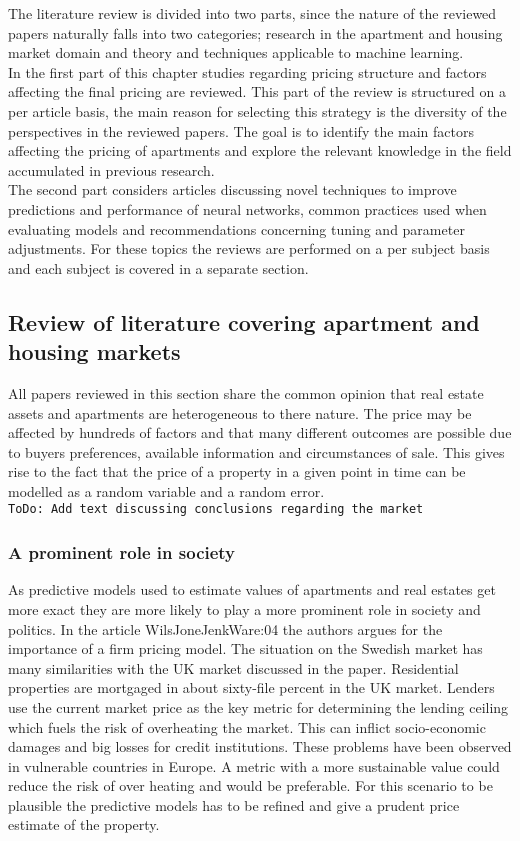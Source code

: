 The literature review is divided into two parts, since the nature of the reviewed papers naturally falls into two categories; research in the apartment and housing market domain and theory and techniques applicable to machine learning. 
\\
In the first part of this chapter studies regarding pricing structure and factors affecting the final pricing are reviewed. This part of the review is structured on a per article basis, the main reason for selecting this strategy is the diversity of the perspectives in the reviewed papers. The goal is to identify the main factors affecting the pricing of apartments and explore the relevant knowledge in the field accumulated in previous research. 
\\
The second part considers articles discussing novel techniques to improve predictions and performance of neural networks, common practices used when evaluating models and recommendations concerning tuning and parameter adjustments. For these topics the reviews are performed on a per subject basis and each subject is covered in a separate section.
\\

\subsection{Review of literature covering apartment and housing markets} 
All papers reviewed in this section share the common opinion that real estate assets and apartments are heterogeneous to there nature. The price may be affected by hundreds of factors and that many different outcomes are possible due to buyers preferences, available information and circumstances of sale. This gives rise to the fact that the price of a property in a given point in time can be modelled as a random variable and a random error. 
\\
\texttt{ToDo: Add text discussing conclusions regarding the market} 

\subsubsection{A prominent role in society}
As predictive models used to estimate values of apartments and real estates get more exact they are more likely to play a more prominent role in society and politics. In the article \cite{art}{WilsJoneJenkWare:04} the authors argues for the importance of a firm pricing model. The situation on the Swedish market has many similarities with the UK market discussed in the paper. Residential properties are mortgaged in about sixty-file percent in the UK market. Lenders use the current market price as the key metric for determining the lending ceiling which fuels the risk of overheating the market. This can inflict socio-economic damages and big losses for credit institutions. These problems have been observed in vulnerable countries in Europe.
A metric with a more sustainable value could reduce the risk of over heating and would be preferable. For this scenario to be plausible the predictive models has to be refined and give a prudent price estimate of the property. 




